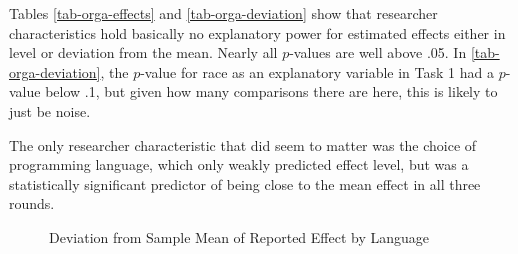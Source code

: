 \documentclass[
  letterpaper,
  DIV=11,
  numbers=noendperiod]{scrartcl}
\begin{document}
Tables \ref{tab-orga-effects} and \ref{tab-orga-deviation} show that
researcher characteristics hold basically no explanatory power for
estimated effects either in level or deviation from the mean. Nearly all
\(p\)-values are well above .05. In \ref{tab-orga-deviation}, the
\(p\)-value for race as an explanatory variable in Task 1 had a
\(p\)-value below .1, but given how many comparisons there are here,
this is likely to just be noise.

The only researcher characteristic that did seem to matter was the
choice of programming language, which only weakly predicted effect
level, but was a statistically significant predictor of being close to
the mean effect in all three rounds.

\begin{figure}


\caption{\label{fig-deviations-by-language}Deviation from Sample Mean of
Reported Effect by Language}

\end{figure}%
\end{document}
